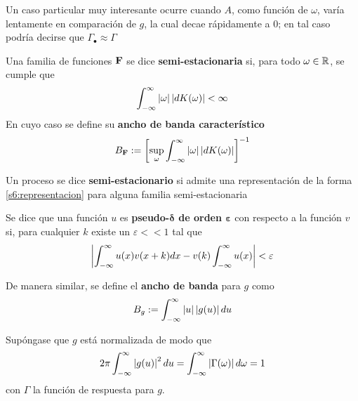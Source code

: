 Un caso particular muy interesante ocurre cuando $A$, como función de $\omega$, varía lentamente en comparación de $g$, la cual decae rápidamente a 0; en tal caso podría decirse que $\Gamma_\bullet \approx \Gamma$

\begin{definicion}
Una familia de funciones $\mathbf{F}$ se dice \textbf{semi-estacionaria} si, para todo $\omega \in \mathbb{R}$, se cumple que
\begin{equation}
\int_{-\infty}^{\infty} \left| \omega \right| \left| dK(\omega) \right| < \infty
\end{equation}
En cuyo caso se define su \textbf{ancho de banda característico}
\begin{equation}
B_{\mathbf{F}} := \left[ \sup_\omega \int_{-\infty}^{\infty} \left| \omega \right| \left| dK(\omega) \right| \right]^{-1}
\end{equation}
\end{definicion}

\begin{definicion}
Un proceso \xt se dice \textbf{semi-estacionario} si admite una representación de la forma \ref{s6:representacion} para alguna familia semi-estacionaria
\end{definicion}


\begin{definicion}
Se dice que una función $u$ es 
\textbf{pseudo-$\boldsymbol{\delta}$ de orden $\boldsymbol{\varepsilon}$} con respecto a la función $v$ si, para cualquier $k$ existe un $\varepsilon << 1$ tal que 
\begin{equation}
\left| \int_{-\infty}^{\infty} u(x) v(x+k) dx  -  v(k)\int_{-\infty}^{\infty} u(x) \right| < \varepsilon
\end{equation}
\end{definicion}

De manera similar, se define el \textbf{ancho de banda} para $g$ como 
\begin{equation}
B_g := \int_{-\infty}^{\infty} \left| u \right| \left| g(u) \right| du
\end{equation}

Supóngase que $g$ está normalizada de modo que
\begin{equation}
2 \pi \int_{-\infty}^{\infty} \left| g(u) \right|^{2} du = \int_{-\infty}^{\infty} \left| \Gamma(\omega) \right| d\omega = 1
\label{s6:norm_g}
\end{equation}
con $\Gamma$ la función de respuesta para $g$.

